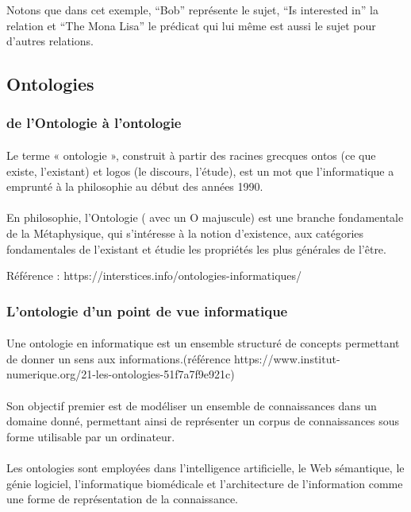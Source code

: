 \documentclass[12pt, a4paper, oneside]{book}
\begin{document}
Notons que dans cet exemple, “Bob” représente le sujet, “Is interested in” la relation et “The Mona Lisa” le prédicat qui lui même est aussi le sujet  pour d'autres relations.

\subsection{Ontologies}

\subsubsection{de l'Ontologie à l'ontologie}
\paragraph{}
Le terme « ontologie », construit à partir des racines grecques ontos (ce que existe, l'existant) et logos (le discours, l'étude), est un mot que l'informatique a emprunté à la philosophie au début des années 1990. 
\paragraph{}
En philosophie, l'Ontologie ( avec un O majuscule) est une branche fondamentale de la Métaphysique, qui s'intéresse à la notion d'existence, aux catégories fondamentales de l'existant et étudie les propriétés les plus générales de l'être.

Référence : https://interstices.info/ontologies-informatiques/

\subsubsection{L'ontologie d'un point de vue informatique}

\paragraph{}
Une ontologie en informatique est un ensemble structuré de concepts permettant de donner un sens aux informations.(référence https://www.institut-numerique.org/21-les-ontologies-51f7a7f9e921c)
\paragraph{}
 Son objectif premier est de modéliser un ensemble de connaissances dans un domaine donné, permettant ainsi de représenter un corpus de connaissances sous forme utilisable par un ordinateur.
\paragraph{}
Les ontologies sont employées dans l'intelligence artificielle, le Web sémantique, le génie logiciel, l'informatique biomédicale et l'architecture de l'information comme une forme de représentation de la connaissance. 
\end{document}
